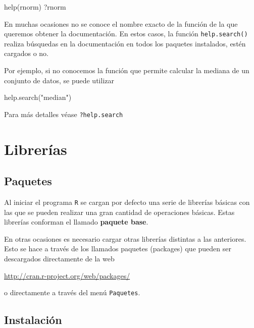 \documentclass[
]{book}
\newenvironment{Shaded}{\begin{snugshade}}{\end{snugshade}}
\newcommand{\FunctionTok}[1]{\textcolor[rgb]{0.00,0.00,0.00}{#1}}
\newcommand{\NormalTok}[1]{#1}
\newcommand{\StringTok}[1]{\textcolor[rgb]{0.31,0.60,0.02}{#1}}
\theoremstyle{break}
\begin{document}
\begin{Shaded}
\begin{Highlighting}[]
\FunctionTok{help}\NormalTok{(rnorm)}
\NormalTok{?rnorm}
\end{Highlighting}
\end{Shaded}

En muchas ocasiones no se conoce el nombre exacto de la función de la
que queremos obtener la documentación. En estos casos, la función
\texttt{help.search()} realiza búsquedas en la documentación en todos los
paquetes instalados, estén cargados o no.

Por ejemplo, si no conocemos la función que permite calcular la mediana
de un conjunto de datos, se puede utilizar

\begin{Shaded}
\begin{Highlighting}[]
\FunctionTok{help.search}\NormalTok{(}\StringTok{"median"}\NormalTok{)}
\end{Highlighting}
\end{Shaded}

Para más detalles véase \texttt{?help.search}

\hypertarget{libreruxedas}{%
\section{Librerías}\label{libreruxedas}}

\hypertarget{paquetes}{%
\subsection{Paquetes}\label{paquetes}}

Al iniciar el programa \texttt{R} se cargan
por defecto una serie de librerías básicas con las que se pueden
realizar una gran cantidad de operaciones básicas. Estas librerías
conforman el llamado \textbf{paquete base}.

En otras ocasiones es necesario cargar otras librerías distintas a las
anteriores. Esto se hace a través de los llamados paquetes (packages)
que pueden ser descargados directamente de la web

\url{http://cran.r-project.org/web/packages/}

o directamente a través del menú \texttt{Paquetes}.

\hypertarget{instalacion-pkg}{%
\subsection{Instalación}\label{instalacion-pkg}}
\end{document}
